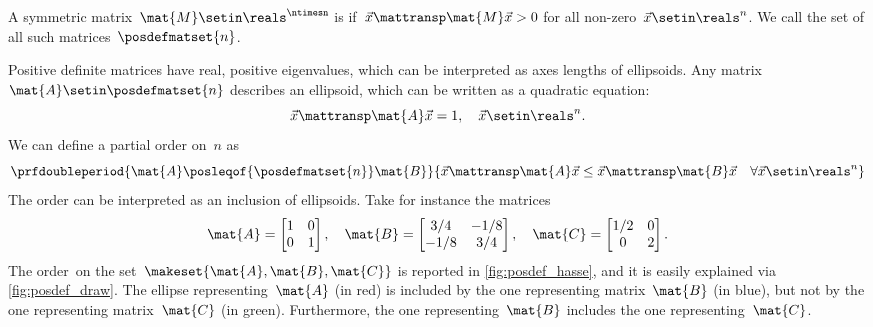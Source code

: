 \begin{definition}
    \label{def:positive-definite-matrices}
    A symmetric matrix~$\mat{M}\setin \reals^{\ntimesn}$ is  if~$\vec{x}\mattransp \mat{M}\vec{x}> 0$ for all non-zero~$\vec{x}\setin \reals^n$.
    We call the set of all such matrices~$\posdefmatset{n}$.
\end{definition}
Positive definite matrices have real, positive eigenvalues, which can be interpreted as axes lengths of ellipsoids.
Any matrix~$\mat{A}\setin \posdefmatset{n}$ describes an ellipsoid, which can be written as a quadratic equation:
\begin{equation}
    \label{eq:posdef-ellipsoid}
    \vec{x}\mattransp \mat{A}\vec{x}=1,\quad \vec{x}\setin \reals^n.
\end{equation}
We can define a partial order on~$n$ as
\begin{equation}
    \label{eq:posdef-order}
    \prfdoubleperiod{
        \mat{A}\posleqof{\posdefmatset{n}} \mat{B}
    }{
        \vec{x}\mattransp \mat{A}\vec{x}\leq \vec{x}\mattransp \mat{B}\vec{x} \quad \forall \vec{x}\setin \reals^n
    }
\end{equation}
The order can be interpreted as an inclusion of ellipsoids.
Take for instance the matrices
\begin{equation}
    \label{eq:posdef-matrices}
    \mat{A}=
    \begin{bmatrix}
        1 & 0 \\ 0& 1
    \end{bmatrix}, \quad \mat{B}=
    \begin{bmatrix}
        3/4 & -1/8 \\ -1/8& 3/4
    \end{bmatrix},\quad \mat{C}=
    \begin{bmatrix}
        1/2 & 0 \\0& 2
    \end{bmatrix}.
\end{equation}
The order~\posA on the set~$\makeset{\mat{A},\mat{B},\mat{C}}$ is reported in \cref{fig:posdef_hasse}, and it is easily explained via \cref{fig:posdef_draw}.
The ellipse representing~$\mat{A}$ (in red) is included by the one representing matrix~$\mat{B}$ (in blue), but not by the one representing matrix~$\mat{C}$ (in green).
Furthermore, the one representing~$\mat{B}$ includes the one representing~$\mat{C}$.

\vfill
